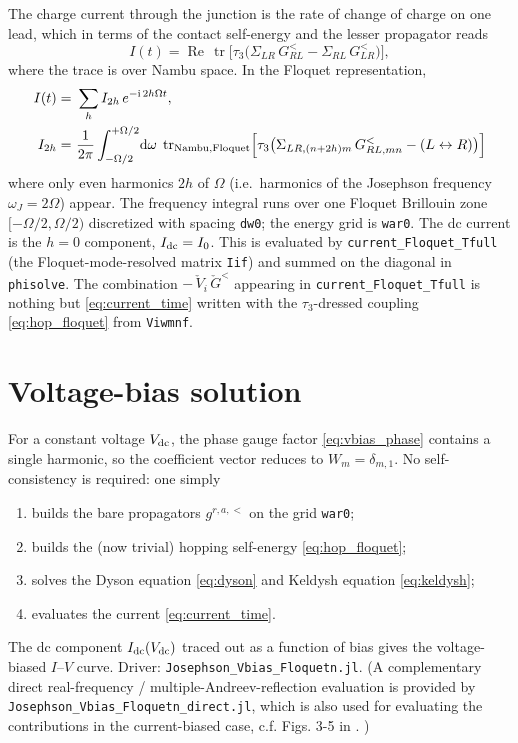 \documentclass[11pt,a4paper]{article}
\newcommand{\dd}{\mathrm{d}}
\newcommand{\ii}{\mathrm{i}}
\newcommand{\tr}{\operatorname{tr}}
\newcommand{\Real}{\operatorname{Re}}
\newcommand{\Gr}{\check{G}}            %
\begin{document}
The charge current through the junction is the rate of change of charge on one
lead, which in terms of the contact self-energy and the lesser propagator reads
\begin{equation}
  I(t) = \Real\,\tr\!\Big[\tau_3\big(\Sigma_{LR}\,G^<_{RL}-\Sigma_{RL}\,G^<_{LR}\big)\Big],
  \label{eq:current_time}
\end{equation}
where the trace is over Nambu space.  In the Floquet representation,
\begin{align}
  I(t) =&\ \sum_{h} I_{2h}\,e^{-\ii\,2h\Omega t},\\
  I_{2h} =&\ \frac{1}{2\pi}\int_{-\Omega/2}^{+\Omega/2}\!\dd\omega\;
           \tr_{\rm Nambu,Floquet}\!\Big[\tau_3\big(\Sigma_{LR,(n+2h)m}\,G^<_{RL,mn}
           -(L\leftrightarrow R)\big)\Big]
  \label{eq:current_harmonics}
\end{align}
where only even harmonics $2h$ of $\Omega$ (i.e.\ harmonics of the Josephson
frequency $\omega_J=2\Omega$) appear.  The frequency integral runs over one
Floquet Brillouin zone $[-\Omega/2,\Omega/2)$ discretized with spacing
\texttt{dw0}; the energy grid is \texttt{war0}.  The dc current is the
$h=0$ component, $I_{\rm dc} = I_0$. This is evaluated by \texttt{current\_Floquet\_Tfull} 
(the Floquet-mode-resolved matrix \texttt{Iif}) and summed on the diagonal in 
\texttt{phisolve}.  The combination $-\,\check V_i\,\Gr^<$ appearing in 
\texttt{current\_Floquet\_Tfull} is nothing but \eqref{eq:current_time} written 
with the $\tau_3$-dressed coupling \eqref{eq:hop_floquet} from \texttt{Viwmnf}.

\section{Voltage-bias solution}
\label{sec:vbias}

For a constant voltage $V_{\rm dc}$, the phase gauge factor
\eqref{eq:vbias_phase} contains a single harmonic, so the coefficient vector
reduces to $W_m=\delta_{m,1}$.  No self-consistency is required: one simply

\begin{enumerate}
  \item builds the bare propagators $g^{r,a,<}$ on the grid \texttt{war0};
  \item builds the (now trivial) hopping self-energy \eqref{eq:hop_floquet};
  \item solves the Dyson equation \eqref{eq:dyson} and Keldysh equation
        \eqref{eq:keldysh};
  \item evaluates the current \eqref{eq:current_time}.
\end{enumerate}
The dc component $I_{\rm dc}(V_{\rm dc})$ traced out as a function of bias gives
the voltage-biased $I$--$V$ curve.  Driver:
\texttt{Josephson\_Vbias\_Floquetn.jl}.  (A complementary direct
real-frequency / multiple-Andreev-reflection evaluation is provided by
\texttt{Josephson\_Vbias\_Floquetn\_direct.jl}, which is also used for evaluating
the contributions in the current-biased case, c.f. Figs. 3-5 in \cite{Lahiri2025SGS}. )
\end{document}
